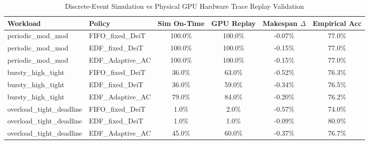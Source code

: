 \begin{table}[t]
\centering
\caption{Discrete-Event Simulation vs Physical GPU Hardware Trace Replay Validation}
\label{tab:hardware_replay}
\small
\begin{tabular}{llcccc}
\hline
\textbf{Workload} & \textbf{Policy} & \textbf{Sim On-Time} & \textbf{GPU Replay} & \textbf{Makespan $\Delta$} & \textbf{Empirical Acc} \\
\hline
periodic\_mod\_mod & FIFO\_fixed\_DeiT & 100.0\% & 100.0\% & -0.07\% & 77.0\% \\
periodic\_mod\_mod & EDF\_fixed\_DeiT & 100.0\% & 100.0\% & -0.15\% & 77.0\% \\
periodic\_mod\_mod & EDF\_Adaptive\_AC & 100.0\% & 100.0\% & -0.15\% & 77.0\% \\
bursty\_high\_tight & FIFO\_fixed\_DeiT & 36.0\% & 63.0\% & -0.52\% & 76.3\% \\
bursty\_high\_tight & EDF\_fixed\_DeiT & 36.0\% & 59.0\% & -0.34\% & 76.5\% \\
bursty\_high\_tight & EDF\_Adaptive\_AC & 79.0\% & 84.0\% & -0.20\% & 76.2\% \\
overload\_tight\_deadline & FIFO\_fixed\_DeiT & 1.0\% & 2.0\% & -0.57\% & 74.0\% \\
overload\_tight\_deadline & EDF\_fixed\_DeiT & 1.0\% & 1.0\% & -0.09\% & 80.0\% \\
overload\_tight\_deadline & EDF\_Adaptive\_AC & 45.0\% & 60.0\% & -0.37\% & 76.7\% \\
\hline
\end{tabular}
\end{table}
